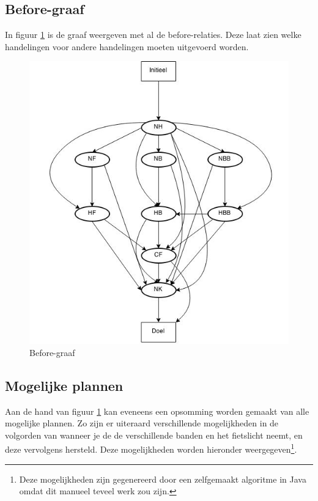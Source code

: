 \documentclass{article}
\begin{document}
\newpage
\subsection{Before-graaf}

In figuur \ref{Before-graaf} is de graaf weergeven met al de before-relaties. Deze laat zien welke handelingen voor andere handelingen moeten uitgevoerd worden.

\begin{figure}[H]
\centering
\caption{Before-graaf}
\label{Before-graaf}
\includegraphics[scale=0.5]{Before_graaf.jpg}
\end{figure}

\newpage
\subsection{Mogelijke plannen}

Aan de hand van figuur \ref{Before-graaf} kan eveneens een opsomming worden gemaakt van alle mogelijke plannen. Zo zijn er uiteraard verschillende mogelijkheden in de volgorden van wanneer je de de verschillende banden en het fietslicht neemt, en deze vervolgens hersteld. Deze mogelijkheden worden hieronder weergegeven\footnote{Deze mogelijkheden zijn gegenereerd door een zelfgemaakt algoritme in Java omdat dit manueel teveel werk zou zijn.}.
\end{document}
